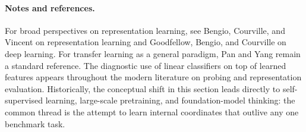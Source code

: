 \paragraph{Notes and references.}
For broad perspectives on representation learning, see Bengio, Courville, and Vincent on representation learning and Goodfellow, Bengio, and Courville on deep learning.
For transfer learning as a general paradigm, Pan and Yang remain a standard reference.
The diagnostic use of linear classifiers on top of learned features appears throughout the modern literature on probing and representation evaluation.
Historically, the conceptual shift in this section leads directly to self-supervised learning, large-scale pretraining, and foundation-model thinking:
the common thread is the attempt to learn internal coordinates that outlive any one benchmark task.
